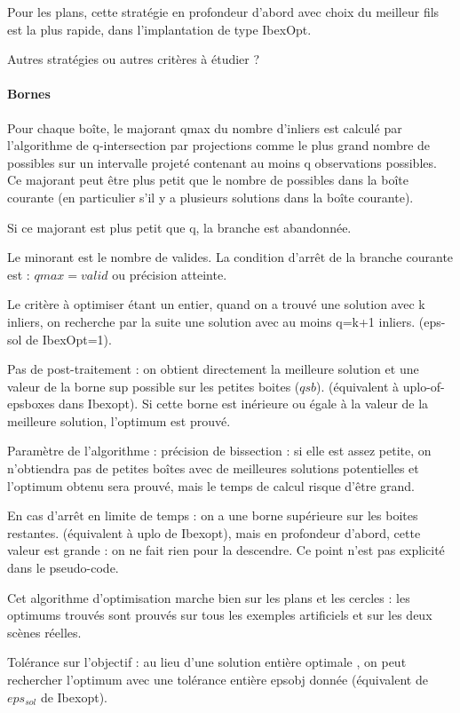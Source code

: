 \documentclass{article}
\begin{document}
Pour les plans, cette strat\'egie en profondeur d'abord avec  choix du meilleur fils est la plus rapide, dans l'implantation
de type IbexOpt.

Autres strat\'egies ou autres crit\`eres \`a \'etudier ?  
\paragraph{Bornes}
Pour chaque bo\^ite, le majorant qmax du nombre d'inliers est calcul\'e par l'algorithme de q-intersection par projections comme le plus grand nombre de possibles sur un intervalle projet\'e contenant au moins q observations possibles. Ce majorant peut \^etre
plus petit que le nombre de possibles dans la bo\^ite courante (en particulier s'il y a plusieurs solutions dans la bo\^ite
courante).

Si ce majorant est plus petit que q, la branche est abandonn\'ee.

Le minorant est le nombre de valides.
La condition d'arr\^et de la branche courante est :  $qmax = valid$  ou pr\'ecision atteinte.

Le crit\`ere \`a optimiser \'etant un entier, quand on a trouv\'e une solution avec k inliers, on recherche par la
suite une solution avec au moins q=k+1 inliers.   (eps-sol de IbexOpt=1).

   Pas de post-traitement :  on obtient directement la meilleure solution et une valeur de la borne sup possible sur les petites 
boites ($qsb$).  (\'equivalent \`a uplo-of-epsboxes dans Ibexopt). Si cette borne est in\'erieure ou \'egale \`a la valeur de la meilleure solution, l'optimum est prouv\'e.

   Param\`etre de l'algorithme : pr\'ecision de bissection :  si elle est assez petite, on n'obtiendra pas de petites bo\^ites
avec de meilleures solutions potentielles et l'optimum obtenu sera prouv\'e, mais le temps de calcul risque d'\^etre grand.

   En cas d'arr\^et en limite de temps : on a une borne sup\'erieure sur les boites restantes.  (\'equivalent \`a uplo de Ibexopt), mais en profondeur d'abord, cette valeur est grande  : on ne fait rien pour la descendre.
Ce point n'est pas explicit\'e dans le pseudo-code.

   Cet algorithme d'optimisation marche bien sur les plans et les cercles : les optimums trouv\'es sont prouv\'es sur tous les exemples artificiels et sur les deux sc\`enes r\'eelles.

Tol\'erance sur l'objectif : au lieu d'une solution entière optimale , on peut rechercher l'optimum avec une tol\'erance entière epsobj donn\'ee (\'equivalent de $eps_{sol}$ de Ibexopt).
\end{document}
